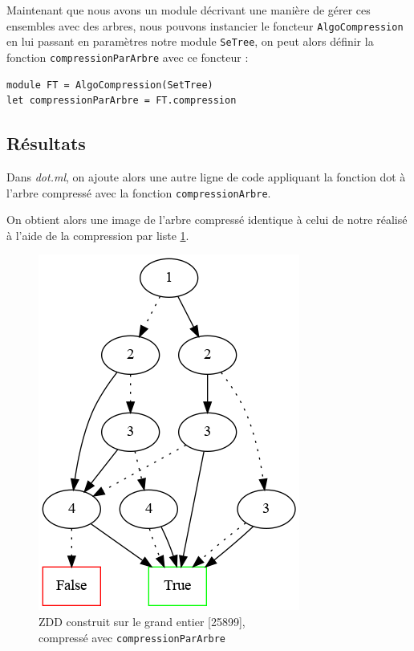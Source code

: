 \documentclass[12pt,a4paper]{article}
\begin{document}
Maintenant que nous avons un module décrivant une manière de gérer ces ensembles avec des arbres, nous pouvons instancier le foncteur \texttt{AlgoCompression} en lui passant en paramètres notre module \texttt{SeTree}, on peut alors définir la fonction \texttt{compressionParArbre} avec ce foncteur : 

\bigskip
\begin{lstlisting}
module FT = AlgoCompression(SetTree)
let compressionParArbre = FT.compression

\end{lstlisting}



\subsection{Résultats}

Dans \textit{dot.ml}, on ajoute alors une autre ligne de code appliquant la fonction dot à l'arbre compressé avec la fonction \texttt{compressionArbre}.

On obtient alors une image de l'arbre compressé identique à celui de notre réalisé à l'aide de la compression par liste \ref{fig3}.

\begin{figure}[hbtp]
\centering
\includegraphics[scale=0.5]{../Images/arbre_compresse_par_arbre.png}
\caption{ZDD construit sur le grand entier [25899],\\ compressé avec \texttt{compressionParArbre}}
\label{fig3}
\end{figure}
\end{document}
